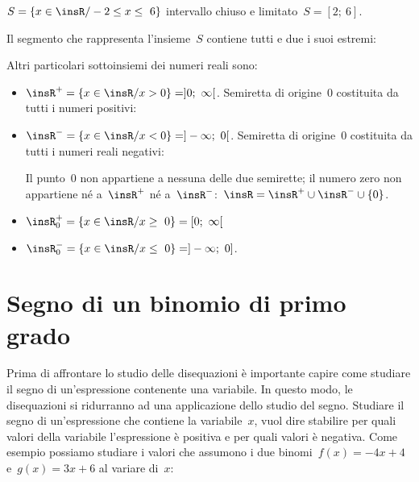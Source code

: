 \begin{exrig}
\begin{esempio}
$S=\{x\in \insR/-2\le x\le~6\}$ intervallo chiuso e 
limitato~$S = [2;~6]$.

Il segmento che rappresenta l'insieme~$S$ contiene tutti e
due i suoi estremi:
\begin{center}
 
\end{center}
\end{esempio}

\begin{esempio}
Altri particolari sottoinsiemi dei numeri reali sono:

\begin{itemize}
\item $\insR^{+}=\{x\in \insR/x>0\} = ]0;~\infty[$. 
Semiretta di origine~0 costituita da tutti i numeri positivi:
\begin{center}
 
\end{center}
\item $\insR^{-}=\{x\in \insR/x<0\} = ]- \infty;~0[$. 
Semiretta di origine~0 costituita da tutti i numeri reali negativi:
\begin{center}
 
\end{center}
\subitem Il punto~0 non appartiene a nessuna delle due semirette; il numero 
 zero non appartiene né 
 a~$\insR^{+}$ né a~$\insR^{-}$:~$\insR=\insR^{+}\cup\insR^{-}\cup\{0\}$.
\item $\insR_{0}^{+}=\{x\in \insR/x\ge~0\} = [0;~\infty[$
\item $\insR_{0}^{-}=\{x\in \insR/x\le~0\} = ]- \infty;~0]$.
\end{itemize}
\end{esempio}
\end{exrig}


\section{Segno di un binomio di primo grado}
\label{sec:dis_binomio}

Prima di affrontare lo studio delle disequazioni è importante capire come 
studiare il segno di un'espressione contenente una variabile. 
In questo modo, le disequazioni si ridurranno ad una applicazione dello 
studio del segno.
Studiare il segno di un'espressione che contiene la variabile~$x$, vuol dire 
stabilire per quali valori della variabile l'espressione è positiva e per 
quali valori è negativa.
Come esempio possiamo studiare i valori che assumono i due 
binomi~$f(x) = -4 x +4$ e~$g(x) = 3 x +6$ al variare di~$x$:

